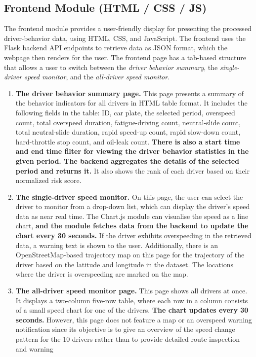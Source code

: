\documentclass[12pt,a4paper]{article}
\begin{document}
\subsection{Frontend Module (HTML / CSS / JS)}

The frontend module provides a user-friendly display for presenting the processed driver-behavior data, using HTML, CSS, and JavaScript. The frontend uses the Flask backend API endpoints to retrieve data as JSON format, which the webpage then renders for the user. The frontend page has a tab-based structure that allows a user to switch between the \textit{driver behavior summary}, the \textit{single-driver speed monitor}, and the \textit{all-driver speed monitor}.

\begin{enumerate}
    \item \textbf{The driver behavior summary page.} This page presents a summary of the behavior indicators for all drivers in HTML table format. It includes the following fields in the table: ID, car plate, the selected period, overspeed count, total overspeed duration, fatigue-driving count, neutral-slide count, total neutral-slide duration, rapid speed-up count, rapid slow-down count, hard-throttle stop count, and oil-leak count. \textbf{There is also a start time and end time filter for viewing the driver behavior statistics in the given period. The backend aggregates the details of the selected period and returns it.} It also shows the rank of each driver based on their normalized risk score.
    \item \textbf{The single-driver speed monitor.} On this page, the user can select the driver to monitor from a drop-down list, which can display the driver’s speed data as near real time. The Chart.js module can visualise the speed as a line chart, \textbf{and the module fetches data from the backend to update the chart every 30 seconds.} If the driver exhibits overspeeding in the retrieved data, a warning text is shown to the user. Additionally, there is an OpenStreetMap-based trajectory map on this page for the trajectory of the driver based on the latitude and longitude in the dataset. The locations where the driver is overspeeding are marked on the map.
    \item \textbf{The all-driver speed monitor page.} This page shows all drivers at once. It displays a two-column five-row table, where each row in a column consists of a small speed chart for one of the drivers. \textbf{The chart updates every 30 seconds.} However, this page does not feature a map or an overspeed warning notification since its objective is to give an overview of the speed change pattern for the 10 drivers rather than to provide detailed route inspection and warning
\end{enumerate}
\end{document}
